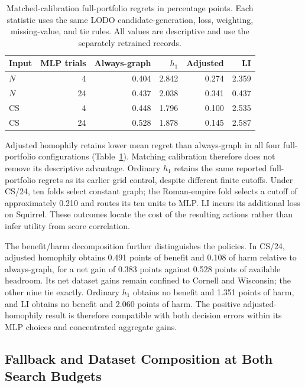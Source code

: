 \begin{table}[tbp]
\centering
\caption{Matched-calibration full-portfolio regrets in percentage points. Each statistic uses the same LODO candidate-generation, loss, weighting, missing-value, and tie rules. All values are descriptive and use the separately retrained records.}
\label{tab:matched_calibration}
\small
\setlength{\tabcolsep}{4pt}
\begin{tabular}{@{}lrrrrr@{}}
\toprule
Input & MLP trials & Always-graph & $h_1$ & Adjusted & LI \\
\midrule
$N$ & 4 & 0.404 & 2.842 & 0.274 & 2.359 \\
$N$ & 24 & 0.437 & 2.038 & 0.341 & 0.437 \\
CS & 4 & 0.448 & 1.796 & 0.100 & 2.535 \\
CS & 24 & 0.528 & 1.878 & 0.145 & 2.587 \\
\bottomrule
\end{tabular}
\end{table}

Adjusted homophily retains lower mean regret than always-graph in all four full-portfolio configurations (Table~\ref{tab:matched_calibration}). Matching calibration therefore does not remove its descriptive advantage. Ordinary $h_1$ retains the same reported full-portfolio regrets as its earlier grid control, despite different finite cutoffs. Under CS/24, ten folds select constant graph; the Roman-empire fold selects a cutoff of approximately 0.210 and routes its ten units to MLP. LI incurs its additional loss on Squirrel. These outcomes locate the cost of the resulting actions rather than infer utility from score correlation.

The benefit/harm decomposition further distinguishes the policies. In CS/24, adjusted homophily obtains 0.491 points of benefit and 0.108 of harm relative to always-graph, for a net gain of 0.383 points against 0.528 points of available headroom. Its net dataset gains remain confined to Cornell and Wisconsin; the other nine tie exactly. Ordinary $h_1$ obtains no benefit and 1.351 points of harm, and LI obtains no benefit and 2.060 points of harm. The positive adjusted-homophily result is therefore compatible with both decision errors within its MLP choices and concentrated aggregate gains.

\subsection{Fallback and Dataset Composition at Both Search Budgets}

